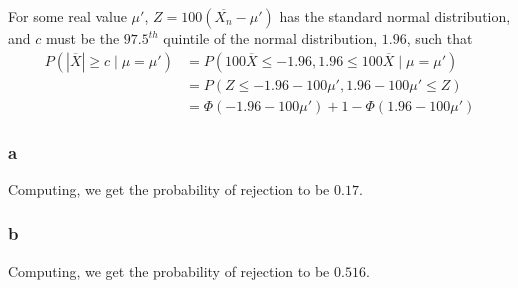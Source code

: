 \documentclass[12pt,letterpaper]{article}
\theoremstyle{definition}
\begin{document}
For some real value $\mu'$, $Z = 100(\overline{X_n} - \mu')$ has the standard normal
distribution, and $c$ must be the $97.5^{th}$ quintile of the normal
distribution, $1.96$, such that
\begin{align*}
  P(|\overline{X}| \geq c \mid \mu = \mu') &= P(100\overline{X} \leq -1.96, 1.96\leq 100 \overline{X} \mid \mu = \mu') \\
                                        &= P(Z \leq -1.96 - 100\mu', 1.96 - 100\mu' \leq Z) \\
                                           &= \Phi(-1.96 - 100\mu') + 1 - \Phi(1.96 - 100\mu')
\end{align*}

\subsubsection*{a}

Computing, we get the probability of rejection to be $0.17$.

\subsubsection*{b}

Computing, we get the probability of rejection to be $0.516$.
\end{document}
